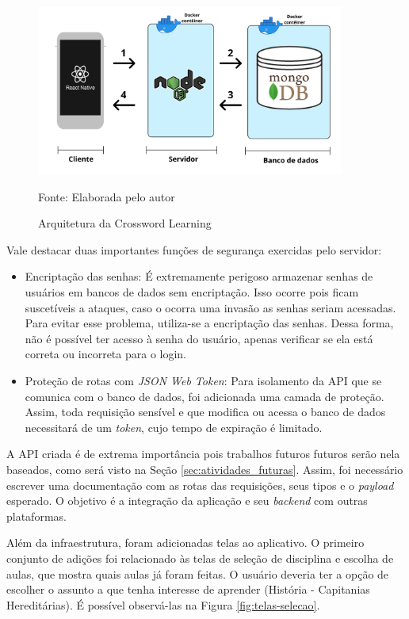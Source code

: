 \begin{figure}[H]
\centering
    \caption{Arquitetura da Crossword Learning}
    \label{fig:arquitetura}
    \includegraphics[width=0.9\textwidth]{Figuras/crossword-archictecture.png}
    
    Fonte: Elaborada pelo autor
\end{figure}

Vale destacar duas importantes funções de segurança exercidas pelo servidor:
\begin{itemize}
    \item Encriptação das senhas: É extremamente perigoso armazenar senhas de usuários em bancos de dados sem encriptação. Isso ocorre pois ficam suscetíveis a ataques, caso o ocorra uma invasão as senhas seriam acessadas. Para evitar esse problema, utiliza-se a encriptação das senhas. Dessa forma, não é possível ter acesso à senha do usuário, apenas verificar se ela está correta ou incorreta para o login.
    
    \item Proteção de rotas com \textit{JSON Web Token}: Para isolamento da API que se comunica com o banco de dados, foi adicionada uma camada de proteção. Assim, toda requisição sensível e que modifica ou acessa o banco de dados necessitará de um \textit{token}, cujo tempo de expiração é limitado.
\end{itemize}

A API criada é de extrema importância pois trabalhos futuros futuros serão nela baseados, como será visto na Seção \ref{sec:atividades_futuras}. Assim, foi necessário escrever uma documentação com as rotas das requisições, seus tipos e o \textit{payload} esperado. O objetivo é a integração da aplicação e seu \textit{backend} com outras plataformas.

Além da infraestrutura, foram adicionadas telas ao aplicativo. O primeiro conjunto de adições foi relacionado às telas de seleção de disciplina e escolha de aulas, que mostra quais aulas já foram feitas. O usuário deveria ter a opção de escolher o assunto a que tenha interesse de aprender (História - Capitanias Hereditárias).
É possível observá-las na Figura \ref{fig:telas-selecao}.

